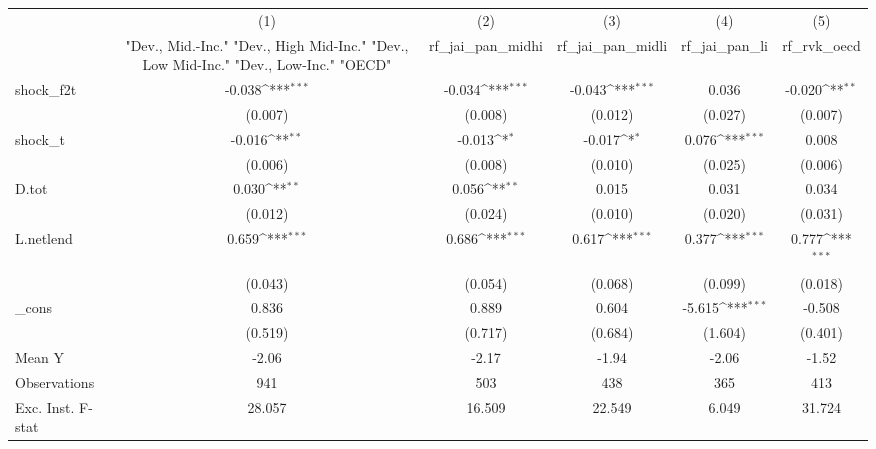 {
\def\sym#1{\ifmmode^{#1}\else\(^{#1}\)\fi}
\begin{tabular}{l*{5}{c}}
\toprule
            &\multicolumn{1}{c}{(1)}&\multicolumn{1}{c}{(2)}&\multicolumn{1}{c}{(3)}&\multicolumn{1}{c}{(4)}&\multicolumn{1}{c}{(5)}\\
            &\multicolumn{1}{c}{ "Dev., Mid.-Inc." "Dev., High Mid-Inc." "Dev., Low Mid-Inc." "Dev., Low-Inc." "OECD" }&\multicolumn{1}{c}{rf\_jai\_pan\_midhi}&\multicolumn{1}{c}{rf\_jai\_pan\_midli}&\multicolumn{1}{c}{rf\_jai\_pan\_li}&\multicolumn{1}{c}{rf\_rvk\_oecd}\\
\midrule
shock\_f2t   &      -0.038\sym{***}&      -0.034\sym{***}&      -0.043\sym{***}&       0.036         &      -0.020\sym{**} \\
            &     (0.007)         &     (0.008)         &     (0.012)         &     (0.027)         &     (0.007)         \\
\addlinespace
shock\_t     &      -0.016\sym{**} &      -0.013\sym{*}  &      -0.017\sym{*}  &       0.076\sym{***}&       0.008         \\
            &     (0.006)         &     (0.008)         &     (0.010)         &     (0.025)         &     (0.006)         \\
\addlinespace
D.tot       &       0.030\sym{**} &       0.056\sym{**} &       0.015         &       0.031         &       0.034         \\
            &     (0.012)         &     (0.024)         &     (0.010)         &     (0.020)         &     (0.031)         \\
\addlinespace
L.netlend   &       0.659\sym{***}&       0.686\sym{***}&       0.617\sym{***}&       0.377\sym{***}&       0.777\sym{***}\\
            &     (0.043)         &     (0.054)         &     (0.068)         &     (0.099)         &     (0.018)         \\
\addlinespace
\_cons      &       0.836         &       0.889         &       0.604         &      -5.615\sym{***}&      -0.508         \\
            &     (0.519)         &     (0.717)         &     (0.684)         &     (1.604)         &     (0.401)         \\
\midrule
Mean Y      &       -2.06         &       -2.17         &       -1.94         &       -2.06         &       -1.52         \\
Observations&         941         &         503         &         438         &         365         &         413         \\
Exc. Inst. F-stat&      28.057         &      16.509         &      22.549         &       6.049         &      31.724         \\
\bottomrule
\end{tabular}
}
